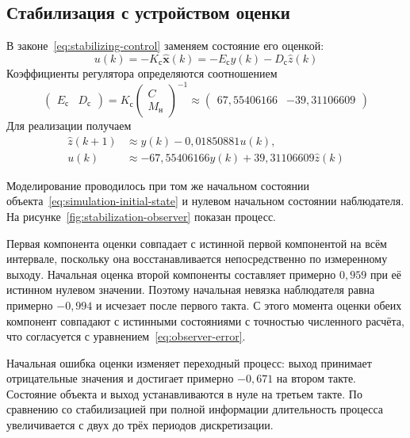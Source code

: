 \subsection{Стабилизация с устройством оценки}

В законе~\eqref{eq:stabilizing-control} заменяем состояние его оценкой:
\begin{equation}
  u(k)=-K_{\text{с}}\hat{\bm x}(k)
      =-E_{\text{с}}y(k)-D_{\text{с}}\hat z(k)
  \label{eq:estimated-stabilizing-control}
\end{equation}
Коэффициенты регулятора определяются соотношением
\begin{equation}
  \begin{pmatrix}E_{\text{с}}&D_{\text{с}}\end{pmatrix}
    =K_{\text{с}}\begin{pmatrix}C\\M_{\text{н}}\end{pmatrix}^{-1}
    \approx\begin{pmatrix}67{,}55406166&-39{,}31106609\end{pmatrix}
  \label{eq:estimated-stabilizing-gains}
\end{equation}
Для реализации получаем
\begin{equation}
  \begin{aligned}
    \hat z(k+1)&\approx y(k)-0{,}01850881u(k),\\
    u(k)&\approx-67{,}55406166y(k)+39{,}31106609\hat z(k)
  \end{aligned}
  \label{eq:estimated-stabilizing-controller}
\end{equation}

Моделирование проводилось при том же начальном
состоянии объекта~\eqref{eq:simulation-initial-state} и нулевом начальном
состоянии наблюдателя. На рисунке~\ref{fig:stabilization-observer}
показан процесс.

Первая компонента оценки совпадает с истинной первой компонентой
на всём интервале, поскольку она восстанавливается непосредственно
по измеренному выходу. Начальная оценка второй компоненты составляет
примерно $0{,}959$ при её истинном нулевом значении. Поэтому начальная
невязка наблюдателя равна примерно $-0{,}994$ и исчезает после первого
такта. С этого момента оценки обеих компонент совпадают с истинными
состояниями с точностью численного расчёта, что согласуется
с уравнением~\eqref{eq:observer-error}.

Начальная ошибка оценки изменяет переходный процесс: выход принимает
отрицательные значения и достигает примерно $-0{,}671$ на втором такте.
Состояние объекта и выход устанавливаются в нуле на третьем такте.
По сравнению со стабилизацией при полной информации длительность
процесса увеличивается с двух до трёх периодов дискретизации.

